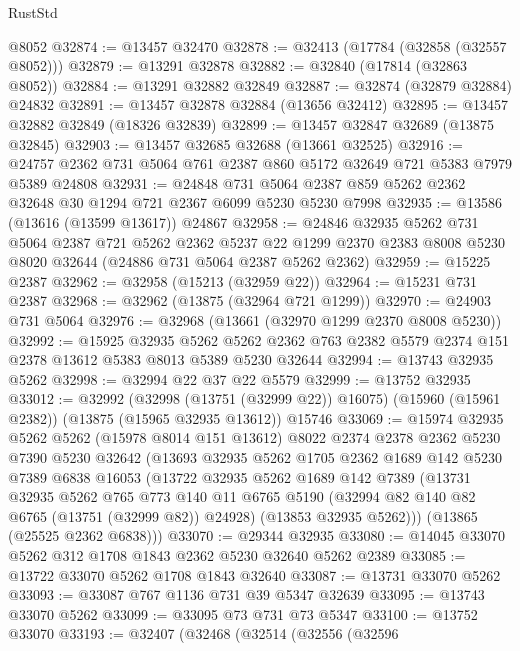 \begin{lexlean}{RustStd}
\begin{coremodule}
    @8052
@32874 := @13457 @32470
@32878 := @32413 (@17784 (@32858 (@32557 @8052)))
@32879 := @13291 @32878
@32882 := @32840 (@17814 (@32863 @8052))
@32884 := @13291 @32882 @32849
@32887 := @32874 (@32879 @32884) @24832
@32891 := @13457 @32878 @32884 (@13656 @32412)
@32895 := @13457 @32882 @32849 (@18326 @32839)
@32899 := @13457 @32847 @32689 (@13875 @32845)
@32903 := @13457 @32685 @32688 (@13661 @32525)
@32916 := @24757 @2362 @731 @5064 @761 @2387 @860 @5172 @32649 @721 @5383 @7979 @5389 @24808
@32931 := @24848
    @731
    @5064
    @2387
    @859
    @5262
    @2362
    @32648
    @30
    @1294
    @721
    @2367
    @6099
    @5230
    @5230
    @7998
@32935 := @13586 (@13616 (@13599 @13617)) @24867
@32958 := @24846
    @32935
    @5262
    @731
    @5064
    @2387
    @721
    @5262
    @2362
    @5237
    @22
    @1299
    @2370
    @2383
    @8008
    @5230
    @8020
    @32644
    (@24886 @731 @5064 @2387 @5262 @2362)
@32959 := @15225 @2387
@32962 := @32958 (@15213 (@32959 @22))
@32964 := @15231 @731 @2387
@32968 := @32962 (@13875 (@32964 @721 @1299))
@32970 := @24903 @731 @5064
@32976 := @32968 (@13661 (@32970 @1299 @2370 @8008 @5230))
@32992 := @15925
    @32935
    @5262
    @5262
    @2362
    @763
    @2382
    @5579
    @2374
    @151
    @2378
    @13612
    @5383
    @8013
    @5389
    @5230
    @32644
@32994 := @13743 @32935 @5262
@32998 := @32994 @22 @37 @22 @5579
@32999 := @13752 @32935
@33012 := @32992
    (@32998 (@13751 (@32999 @22)) @16075)
    (@15960 (@15961 @2382))
    (@13875 (@15965 @32935 @13612))
    @15746
@33069 := @15974
    @32935
    @5262
    @5262
    (@15978 @8014 @151 @13612)
    @8022
    @2374
    @2378
    @2362
    @5230
    @7390
    @5230
    @32642
    (@13693
      @32935
      @5262
      @1705
      @2362
      @1689
      @142
      @5230
      @7389
      @6838
      @16053
      (@13722
        @32935
        @5262
        @1689
        @142
        @7389
        (@13731
          @32935
          @5262
          @765
          @773
          @140
          @11
          @6765
          @5190
          (@32994 @82 @140 @82 @6765 (@13751 (@32999 @82)) @24928)
          (@13853 @32935 @5262)))
      (@13865 (@25525 @2362 @6838)))
@33070 := @29344 @32935
@33080 := @14045 @33070 @5262 @312 @1708 @1843 @2362 @5230 @32640 @5262 @2389
@33085 := @13722 @33070 @5262 @1708 @1843 @32640
@33087 := @13731 @33070 @5262
@33093 := @33087 @767 @1136 @731 @39 @5347 @32639
@33095 := @13743 @33070 @5262
@33099 := @33095 @73 @731 @73 @5347
@33100 := @13752 @33070
@33193 := @32407
    (@32468
      (@32514
        (@32556
          (@32596

\end{coremodule}
\end{lexlean}
